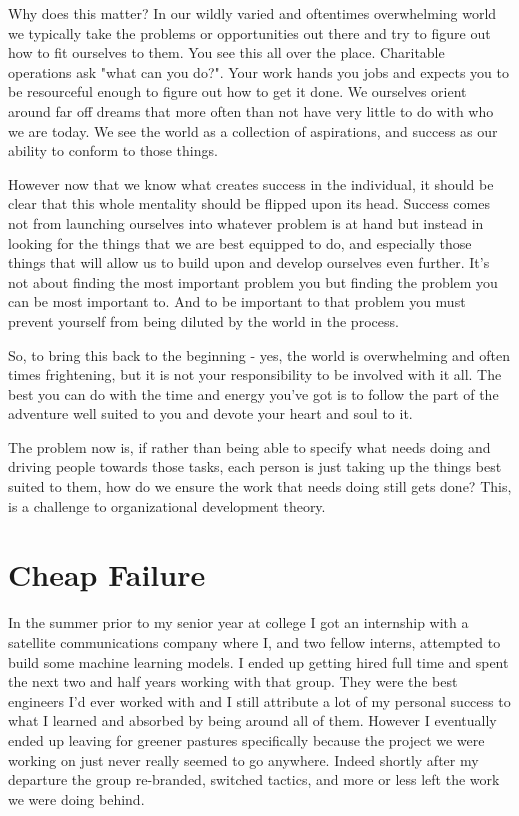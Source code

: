 \documentclass[11pt,a5paper]{book}
\begin{document}
Why does this matter? In our wildly varied and oftentimes overwhelming world we typically take the problems or opportunities out there and try to figure out how to fit ourselves to them. You see this all over the place. Charitable operations ask "what can you do?". Your work hands you jobs and expects you to be resourceful enough to figure out how to get it done. We ourselves orient around far off dreams that more often than not have very little to do with who we are today. We see the world as a collection of aspirations, and success as our ability to conform to those things. 
\newline

However now that we know what creates success in the individual, it should be clear that this whole mentality should be flipped upon its head. Success comes not from launching ourselves into whatever problem is at hand but instead in looking for the things that we are best equipped to do, and especially those things that will allow us to build upon and develop ourselves even further. It's not about finding the most important problem you but finding the problem you can be most important to. And to be important to that problem you must prevent yourself from being diluted by the world in the process. 
\newline

So, to bring this back to the beginning - yes, the world is overwhelming and often times frightening, but it is not your responsibility to be involved with it all. The best you can do with the time and energy you've got is to follow the part of the adventure well suited to you and devote your heart and soul to it. 
\newline

The problem now is, if rather than being able to specify what needs doing and driving people towards those tasks, each person is just taking up the things best suited to them, how do we ensure the work that needs doing still gets done? This, is a challenge to organizational development theory. 

\chapter{Cheap Failure}
In the summer prior to my senior year at college I got an internship with a satellite communications company where I, and two fellow interns, attempted to build some machine learning models. I ended up getting hired full time and spent the next two and half years working with that group. They were the best engineers I'd ever worked with and I still attribute a lot of my personal success to what I learned and absorbed by being around all of them. However I eventually ended up leaving for greener pastures specifically because the project we were working on just never really seemed to go anywhere. Indeed shortly after my departure the group re-branded, switched tactics, and more or less left the work we were doing behind. 
\newline
\end{document}
